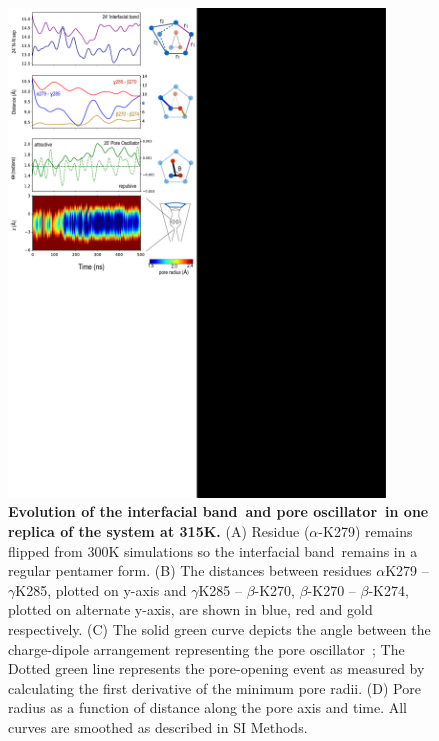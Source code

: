 \documentclass[9pt,onecolumn,oneside,lineno]{pnas-new}
\newcommand{\fivering}{interfacial band~}
\newcommand{\triad}{pore oscillator~}
\begin{document}
\begin{figure}
\begin{center}
\includegraphics[width = 100mm]{figures_2/pore_opening_events_M315_1.pdf}
\end{center}
\caption{{\bf Evolution of the \fivering and \triad in one replica of the \MT system at 315K.} (A)  Residue ($\alpha$-K279) remains flipped from 300K simulations so the \fivering remains in a regular pentamer form.  (B) The distances between residues $\alpha$K279 -- $\gamma$K285, plotted on y-axis and  $\gamma$K285 -- $\beta$-K270, $\beta$-K270 -- $\beta$-K274, plotted on alternate y-axis, are shown in blue, red and gold respectively. (C) The solid green curve depicts the angle between the charge-dipole arrangement representing the \triad; The Dotted green line represents the pore-opening event as measured by calculating the  first derivative of the minimum pore radii. (D) Pore radius as a function of distance along the pore axis and time.  All curves are smoothed as described in SI Methods.}
\label{fig:M315_1}
\end{figure}
\end{document}
